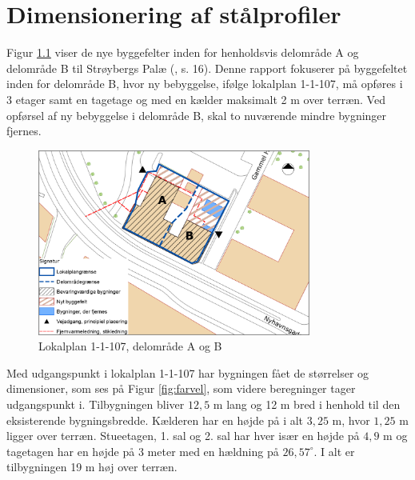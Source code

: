 \chapter{Dimensionering af stålprofiler}

Figur \ref{fig:hej} viser de nye byggefelter inden for henholdsvis delområde A og delområde B til Strøybergs Palæ (\citep{lokalplan}, s. 16). Denne rapport fokuserer på byggefeltet inden for delområde B, hvor ny bebyggelse, ifølge lokalplan 1-1-107, må opføres i 3 etager samt en tagetage og med en kælder maksimalt 2 m over terræn. Ved opførsel af ny bebyggelse i delområde B, skal to nuværende mindre bygninger fjernes. 

\begin{figure}[htbp]
	\centering
	\includegraphics[width=0.8\textwidth]{billeder/signatur.png}
	\caption{Lokalplan 1-1-107, delområde A og B \citep[ bilag 2, s. 35]{lokalplan}}
	\label{fig:hej}
\end{figure}

Med udgangspunkt i lokalplan 1-1-107 har bygningen fået de størrelser og dimensioner, som ses på Figur \ref{fig:farvel}, som videre beregninger tager udgangspunkt i.
\newline \indent{     }  Tilbygningen bliver $12,\!5$ m lang og 12 m bred i henhold til den eksisterende bygningsbredde. Kælderen har en højde på i alt $3,\!25$ m, hvor $1,\!25$ m ligger over terræn. Stueetagen, 1. sal og 2. sal har hver især en højde på $4,\!9$ m og tagetagen har en højde på 3 meter med en hældning på $26,\!57^{\circ}$. I alt er tilbygningen 19 m høj over terræn.

